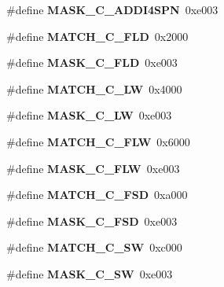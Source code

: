 \begin{DoxyCompactItemize}
\#define {\bfseries M\+A\+S\+K\+\_\+\+C\+\_\+\+A\+D\+D\+I4\+S\+PN}~0xe003
\item 
\mbox{\label{riscv-utility_8h_aff5e06a8a25ea336bd0f9bbde151f09d}} 
\#define {\bfseries M\+A\+T\+C\+H\+\_\+\+C\+\_\+\+F\+LD}~0x2000
\item 
\mbox{\label{riscv-utility_8h_a72bff929fa69ee45f6ff3d73f7c343cf}} 
\#define {\bfseries M\+A\+S\+K\+\_\+\+C\+\_\+\+F\+LD}~0xe003
\item 
\mbox{\label{riscv-utility_8h_a25a8c28a0b401ee67b408efe6a6d0eff}} 
\#define {\bfseries M\+A\+T\+C\+H\+\_\+\+C\+\_\+\+LW}~0x4000
\item 
\mbox{\label{riscv-utility_8h_abb69fd0d8d49cafa72c1733680725fe3}} 
\#define {\bfseries M\+A\+S\+K\+\_\+\+C\+\_\+\+LW}~0xe003
\item 
\mbox{\label{riscv-utility_8h_ac2482726b755caefed70b3d9f9bf8c7b}} 
\#define {\bfseries M\+A\+T\+C\+H\+\_\+\+C\+\_\+\+F\+LW}~0x6000
\item 
\mbox{\label{riscv-utility_8h_a5bb9160fb08bbbc169d784291ff51616}} 
\#define {\bfseries M\+A\+S\+K\+\_\+\+C\+\_\+\+F\+LW}~0xe003
\item 
\mbox{\label{riscv-utility_8h_a66217bdad00e78b90d9b54f4f37e959f}} 
\#define {\bfseries M\+A\+T\+C\+H\+\_\+\+C\+\_\+\+F\+SD}~0xa000
\item 
\mbox{\label{riscv-utility_8h_aaf4826014e2aa82f3e60a9ba65f16067}} 
\#define {\bfseries M\+A\+S\+K\+\_\+\+C\+\_\+\+F\+SD}~0xe003
\item 
\mbox{\label{riscv-utility_8h_a3e8681ee648b50ed8659f7813a526e79}} 
\#define {\bfseries M\+A\+T\+C\+H\+\_\+\+C\+\_\+\+SW}~0xc000
\item 
\mbox{\label{riscv-utility_8h_aa5a8c1bbee73b59e56c4faf549aeadc4}} 
\#define {\bfseries M\+A\+S\+K\+\_\+\+C\+\_\+\+SW}~0xe003
\item 
\mbox{\label{riscv-utility_8h_a40dbfa0ff5d6fdeb61ff5834d3334d93}} 

\end{DoxyCompactItemize}
